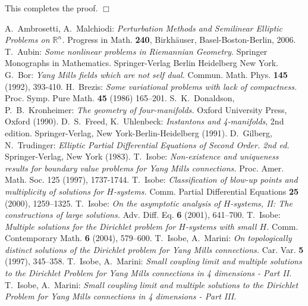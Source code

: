 \documentclass[11pt]{article}
\numberwithin{equation}{section} \setlength{\topmargin}{-35pt}
\newcommand{\R}{\mathbb{R}}
\begin{document}
This completes the proof. \hfill$\Box$
\begin{thebibliography}{99}
A.~Ambrosetti, A.~Malchiodi: \textit{Perturbation Methods and
Semilinear Elliptic Problems on $\R^n$.} Progress in Math. {\bf
240}, Birkh\"auser, Basel-Boston-Berlin, 2006.
T.~Aubin: \emph{Some nonlinear problems in Riemannian Geometry.}
Springer Monographs in Mathematics. Springer-Verlag Berlin
Heidelberg New York.
G.~Bor: \emph{Yang Mills fields which are not self dual.} Commun.
Math. Phys. {\bf 145} (1992), 393-410.
H.~Brezis: \emph{Some variational problems with lack of
compactness.} Proc. Symp. Pure Math. {\bf 45} (1986) 165--201.
S.~K.~Donaldson, P.~B.~Kronheimer: \textit{The geometry of
four-manifolds.} Oxford University Press, Oxford (1990).
D.~S.~Freed, K.~Uhlenbeck: \emph{Instantons and 4-manifolds}, 2nd
edition. Springer-Verlag, New York-Berlin-Heidelberg (1991).
D.~Gilberg, N.~Trudinger: \textit{Elliptic Partial Differential
Equations of Second Order. 2nd ed.} Springer-Verlag, New York
(1983).
T.~Isobe: \emph{Non-existence and uniqueness results for boundary
value problems for Yang Mills connections.} Proc. Amer. Math. Soc.
125 (1997), 1737-1744.
T.~Isobe: \emph{Classification of blow-up points and multiplicity of
solutions for $H$-systems.} Comm. Partial Differential Equations
{\bf 25} (2000), 1259--1325.
T.~Isobe: \emph{On the asymptotic analysis of $H$-systems, II: The
constructions of large solutions.} Adv. Diff. Eq. {\bf 6} (2001),
641--700.
T.~Isobe: \emph{Multiple solutions for the Dirichlet problem for
$H$-systems with small $H$.} Comm. Contemporary Math. {\bf 6}
(2004), 579--600.
T.~Isobe, A.~Marini: \emph{On topologically distinct solutions of
the Dirichlet problem for Yang Mills connections.} Car. Var. {\bf 5}
(1997), 345--358.
T.~Isobe, A.~Marini: \emph{Small coupling limit and multiple
solutions to the Dirichlet Problem for Yang Mills connections in 4
dimensions - Part II.}
T.~Isobe, A.~Marini: \emph{Small coupling limit and multiple
solutions to the Dirichlet Problem for Yang Mills connections in 4
dimensions - Part III.}

\end{thebibliography}
\end{document}
